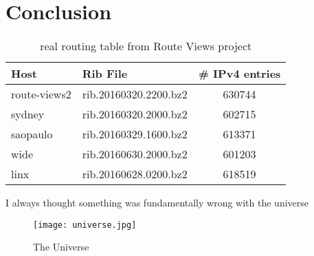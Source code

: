 \documentclass[11pt,a4paper]{article}
\begin{document}
\section{Conclusion}
\begin{table}
	\begin{tabular}{l|l|c}
		\hline
		\hline 
		Host & Rib File & \# IPv4 entries\\
		\hline
		route-views2&rib.20160320.2200.bz2&630744\\
		sydney&rib.20160320.2000.bz2&602715\\
		saopaulo&rib.20160329.1600.bz2&613371\\
		wide&rib.20160630.2000.bz2&601203\\
		linx&rib.20160628.0200.bz2&618519\\
		
		\hline
	\end{tabular}
	\caption{real routing table from Route Views project}
	\label{tab:rvdata}
\end{table}

I always thought something was fundamentally wrong with the universe \citep{adams1995hitchhiker}
\begin{figure}[h!]
	\centering
	\texttt{[image: universe.jpg]}
	\caption{The Universe}
	\label{fig:univerise}
\end{figure}



\end{document}
